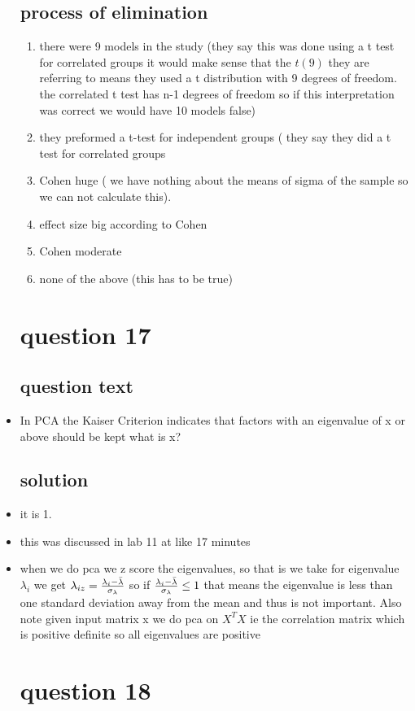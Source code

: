 \documentclass{article}
\begin{document}
\begin{itemize}
\subsection{process of elimination}
\begin{enumerate}
    \item there were 9 models in the study (they say this was done using a t test for correlated groups it would make sense that the $t(9)$ they are referring to means they used a t distribution with 9 degrees of freedom. the correlated t test has n-1 degrees of freedom so if this interpretation was correct we would have 10 models false)
    \item they preformed a t-test for independent groups ( they say they did a t test for correlated groups 
    \item Cohen huge ( we have nothing about the means of sigma of the sample so we can not calculate this). 
    \item effect size big according to Cohen
    \item Cohen moderate
    \item none of the above (this has to be true)
\end{enumerate}
\section{question 17}
\subsection{question text}
\item In PCA the Kaiser Criterion indicates that factors with an eigenvalue of x or above should be kept what is x?
\subsection{solution}
\item it is 1. 
\item this was discussed in lab 11 at like 17 minutes
\item when we do pca we z score the eigenvalues, so that is we take for eigenvalue $\lambda_i$ we get $\lambda_{iz}=\frac{\lambda_i-\Bar{\lambda}}{\sigma_\lambda}$ so if $\frac{\lambda_i-\Bar{\lambda}}{\sigma_\lambda}\leq 1$ that means the eigenvalue is less than one standard deviation away from the mean and thus is not important. Also note given input matrix x we do pca on $X^TX$ ie the correlation matrix which is positive definite so all eigenvalues are positive
\section{question 18}

\end{itemize}
\end{document}
